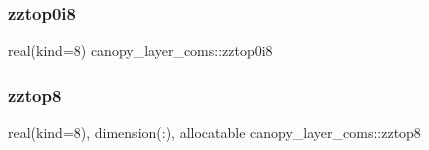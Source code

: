 \subsubsection{\texorpdfstring{zztop0i8}{zztop0i8}}
{\footnotesize\ttfamily real(kind=8) canopy\+\_\+layer\+\_\+coms\+::zztop0i8}

\mbox{\label{namespacecanopy__layer__coms_a365c61dc2bce371b5384ff2bbc4c2a9d}} 
\subsubsection{\texorpdfstring{zztop8}{zztop8}}
{\footnotesize\ttfamily real(kind=8), dimension(\+:), allocatable canopy\+\_\+layer\+\_\+coms\+::zztop8}

